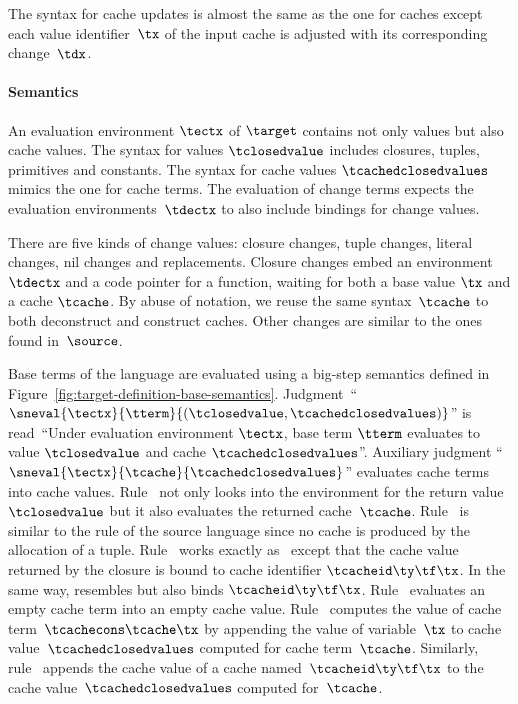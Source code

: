The syntax for cache updates is almost the same as the one for caches
except each value identifier~$\tx$ of the input cache is adjusted with
its corresponding change~$\tdx$.

\paragraph{Semantics}
An evaluation environment $\tectx$ of $\target$ contains not only
values but also cache values. The syntax for values $\tclosedvalue$
includes closures, tuples, primitives and constants. The syntax for
cache values $\tcachedclosedvalues$ mimics the one for cache terms.
The evaluation of change terms expects the evaluation
environments~$\tdectx$ to also include bindings for change values.

There are five kinds of change values: closure changes, tuple changes,
literal changes, nil changes and replacements.  Closure changes embed
an environment $\tdectx$ and a code pointer for a function,
waiting for both a base value $\tx$ and a cache $\tcache$. By abuse of notation,
we reuse the same syntax~$\tcache$ to both deconstruct and
construct caches. Other changes are similar to the ones found
in~$\source$.

Base terms of the language are evaluated using a big-step
semantics defined in Figure~\ref{fig:target-definition-base-semantics}.
Judgment~``$\sneval{\tectx}{\tterm}{(\tclosedvalue,
  \tcachedclosedvalues)}$'' is read~``Under evaluation environment
$\tectx$, base term $\tterm$ evaluates to value
$\tclosedvalue$ and cache $\tcachedclosedvalues$''. Auxiliary
judgment ``$\sneval{\tectx}{\tcache}{\tcachedclosedvalues}$''
evaluates cache terms into cache values.
%
Rule~ not only looks into the environment
for the return value~$\tclosedvalue$ but it also evaluates
the returned cache~$\tcache$.
%
Rule~ is similar to the rule of the source
language since no cache is produced by the allocation of a tuple.
%
Rule~ works exactly
as~ except that the cache value returned by the
closure is bound to cache identifier $\tcacheid\ty\tf\tx$.
In the same way,  resembles 
but also binds $\tcacheid\ty\tf\tx$.
%
Rule~ evaluates an empty cache term into an
empty cache value. Rule~ computes the value of
cache term~$\tcachecons\tcache\tx$ by appending the value of
variable~$\tx$ to cache value~$\tcachedclosedvalues$ computed for
cache term~$\tcache$. Similarly,
rule~ appends the cache value of a cache
named~$\tcacheid\ty\tf\tx$ to the cache value~$\tcachedclosedvalues$
computed for~$\tcache$.

